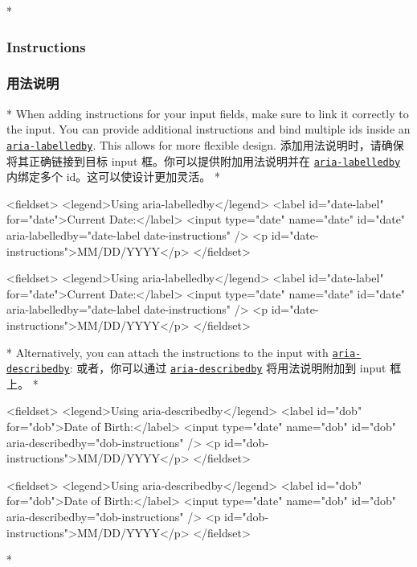 \begin{paracol}{2} 
 
\switchcolumn[0]*%
\subsubsection{Instructions}
\switchcolumn
\subsubsection{用法说明}
\switchcolumn[0]*%
When adding instructions for your input fields, make sure to link it
correctly to the input. You can provide additional instructions and bind
multiple ids inside an
\href{https://developer.mozilla.org/en-US/docs/Web/Accessibility/ARIA/Attributes/aria-labelledby}{\texttt{aria-labelledby}}.
This allows for more flexible design.
\switchcolumn
添加用法说明时，请确保将其正确链接到目标 input
框。你可以提供附加用法说明并在
\href{https://developer.mozilla.org/en-US/docs/Web/Accessibility/ARIA/Attributes/aria-labelledby}{\texttt{aria-labelledby}}
内绑定多个 id。这可以使设计更加灵活。
\switchcolumn[0]*%
\begin{codeHtml}
<fieldset>
  <legend>Using aria-labelledby</legend>
  <label id="date-label" for="date">Current Date:</label>
  <input
    type="date"
    name="date"
    id="date"
    aria-labelledby="date-label date-instructions"
  />
  <p id="date-instructions">MM/DD/YYYY</p>
</fieldset>
\end{codeHtml}
\switchcolumn
\begin{codeHtml}
<fieldset>
  <legend>Using aria-labelledby</legend>
  <label id="date-label" for="date">Current Date:</label>
  <input
    type="date"
    name="date"
    id="date"
    aria-labelledby="date-label date-instructions"
  />
  <p id="date-instructions">MM/DD/YYYY</p>
</fieldset>
\end{codeHtml}
\switchcolumn[0]*%
Alternatively, you can attach the instructions to the input with
\href{https://developer.mozilla.org/en-US/docs/Web/Accessibility/ARIA/Attributes/aria-describedby}{\texttt{aria-describedby}}:
\switchcolumn
或者，你可以通过
\href{https://developer.mozilla.org/en-US/docs/Web/Accessibility/ARIA/Attributes/aria-labelledby}{\texttt{aria-describedby}}
将用法说明附加到 input 框上。
\switchcolumn[0]*%
\begin{codeHtml}
<fieldset>
  <legend>Using aria-describedby</legend>
  <label id="dob" for="dob">Date of Birth:</label>
  <input type="date" name="dob" id="dob" aria-describedby="dob-instructions" />
  <p id="dob-instructions">MM/DD/YYYY</p>
</fieldset>
\end{codeHtml}
\switchcolumn
\begin{codeHtml}
<fieldset>
  <legend>Using aria-describedby</legend>
  <label id="dob" for="dob">Date of Birth:</label>
  <input type="date" name="dob" id="dob" aria-describedby="dob-instructions" />
  <p id="dob-instructions">MM/DD/YYYY</p>
</fieldset>
\end{codeHtml}
\switchcolumn[0]*%

\end{paracol}

